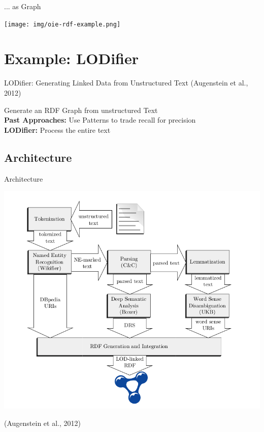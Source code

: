 \documentclass[11pt]{beamer}
\begin{document}
		\begin{frame}{... as Graph}
			\begin{center}
				\texttt{[image: img/oie-rdf-example.png]}
			\end{center}			
		\end{frame}

\section{Example: LODifier}
	\begin{frame}{LODifier: Generating Linked Data from Unstructured Text (Augenstein et al., 2012)}
		\begin{center}
			Generate an RDF Graph from unstructured Text\\
			\vspace{15pt}
			\textbf{Past Approaches:} Use Patterns to trade recall for precision\\
			\textbf{LODifier:} Process the entire text
		\end{center}
	\end{frame}
	\subsection{Architecture}
		\begin{frame}{Architecture}
			\begin{center}
				\includegraphics[scale=0.22]{img/oie-lodifier-architecture.png}
			\end{center}
			\tiny{(Augenstein et al., 2012)}
		\end{frame}
		
\end{document}
